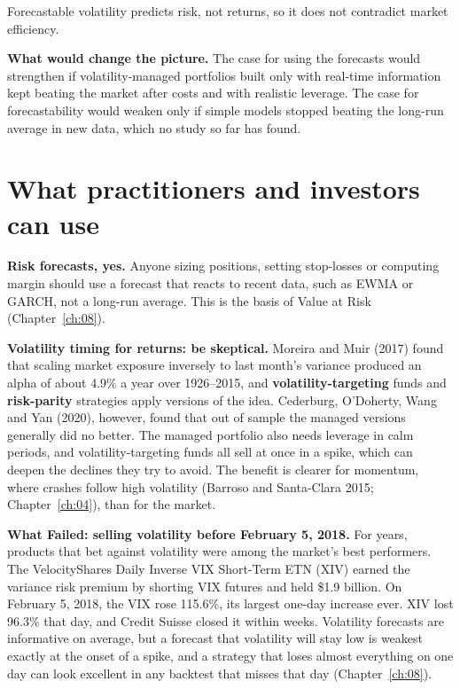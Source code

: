 Forecastable volatility predicts risk, not returns, so it does not contradict market efficiency.

\textbf{What would change the picture.} The case for using the forecasts would strengthen if volatility-managed portfolios built only with real-time information kept beating the market after costs and with realistic leverage. The case for forecastability would weaken only if simple models stopped beating the long-run average in new data, which no study so far has found.

\section{What practitioners and investors can use}
\label{sec:10-investors}

\textbf{Risk forecasts, yes.} Anyone sizing positions, setting stop-losses or computing margin should use a forecast that reacts to recent data, such as EWMA or GARCH, not a long-run average. This is the basis of Value at Risk (Chapter~\ref{ch:08}).

\textbf{Volatility timing for returns: be skeptical.} Moreira and Muir (2017) found that scaling market exposure inversely to last month's variance produced an alpha of about 4.9\% a year over 1926--2015, and \textbf{volatility-targeting} funds and \textbf{risk-parity} strategies apply versions of the idea. Cederburg, O'Doherty, Wang and Yan (2020), however, found that out of sample the managed versions generally did no better. The managed portfolio also needs leverage in calm periods, and volatility-targeting funds all sell at once in a spike, which can deepen the declines they try to avoid. The benefit is clearer for momentum, where crashes follow high volatility (Barroso and Santa-Clara 2015; Chapter~\ref{ch:04}), than for the market.

\begin{callout}
\textbf{What Failed: selling volatility before February 5, 2018.} For years, products that bet against volatility were among the market's best performers. The VelocityShares Daily Inverse VIX Short-Term ETN (XIV) earned the variance risk premium by shorting VIX futures and held \$1.9 billion. On February 5, 2018, the VIX rose 115.6\%, its largest one-day increase ever. XIV lost 96.3\% that day, and Credit Suisse closed it within weeks. Volatility forecasts are informative on average, but a forecast that volatility will stay low is weakest exactly at the onset of a spike, and a strategy that loses almost everything on one day can look excellent in any backtest that misses that day (Chapter~\ref{ch:08}).
\end{callout}

